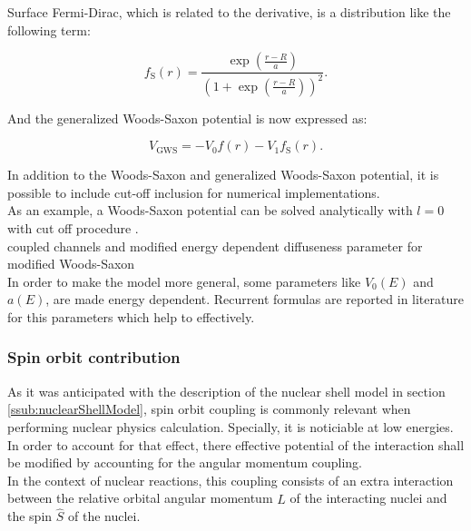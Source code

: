 \documentclass[openany]{book}
\begin{document}
Surface Fermi-Dirac, which is related to the derivative, is a distribution like the following term: 

\begin{equation}  \label{eq:potential_WoodsSaxon2_surfaceFermiDirac}
	f_{\mathrm{S}}(r) = \frac{\exp{\left(\frac{r - R}{a}\right)}}{\left(1 + \exp {\left(\frac{r- R}{a}\right)}\right)^2}.
\end{equation}

And the generalized Woods-Saxon potential is now expressed as: 

\begin{equation} \label{eq:potential_GeneralWoodsSaxon}
	V_{\mathrm{GWS}} = -V_0 f(r) - V_1 	f_{\mathrm{S}}(r).
\end{equation}

In addition to the Woods-Saxon and generalized Woods-Saxon potential, it is possible to include cut-off inclusion for numerical implementations. \\

As an example, a Woods-Saxon potential can be solved analytically with $l = 0$ with cut off procedure \cite{salamon_baran_vertse_2016}. \\

coupled channels and modified energy dependent diffuseness parameter for modified Woods-Saxon \cite{singh_sukhvinder_kharab_2013A} \\


In order to make the model more general, some parameters like $V_0(E)$ and $a(E)$, are made energy dependent. Recurrent formulas are reported in literature for this parameters which help to effectively.

\subsubsection{Spin orbit contribution} \label{sub:potential_effective_spinOrbit}

As it was anticipated with the description of the nuclear shell model in section \ref{ssub:nuclearShellModel}, spin orbit coupling is commonly relevant when performing nuclear physics calculation. Specially, it is noticiable at low energies. \\

In order to account for that effect, there effective potential of the interaction shall be modified by accounting for the angular momentum coupling. \\

 In the context of nuclear reactions, this coupling consists of an extra interaction between the relative orbital angular momentum $\hat L$ of the interacting nuclei and the spin $\hat S$ of the nuclei. \\
\end{document}

